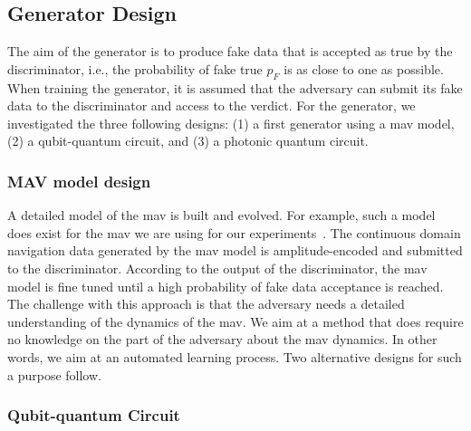 \documentclass[letterpaper, 10pt, conference]{IEEEtran}
\begin{document}
\subsection{Generator Design}
\label{Generator}
The aim of the generator is to produce fake data that is accepted as
true by the discriminator, i.e., the probability of fake true $p_F$ is
as close to one as possible. When training the generator, it is
assumed that the adversary can submit its fake data to the
discriminator and access to the verdict. For the generator,
we investigated the three following designs: (1) a first generator using a
\gls*{mav} model, (2) a qubit-quantum circuit, and (3) 
a photonic quantum circuit. 

\subsubsection{MAV model design}

A detailed model of the \gls*{mav} is built and evolved. For example,
such a model does exist for the \gls*{mav} we are using for our
experiments~\cite{MathWorks2019}. The continuous domain navigation data
generated by the \gls*{mav} model is amplitude-encoded and submitted
to the discriminator. According to the output of the discriminator,
the \gls*{mav} model is fine tuned until a high probability of fake
data acceptance is reached. The challenge with this approach is that
the adversary needs a detailed understanding of the dynamics of the
\gls*{mav}. We aim at a method that does require no knowledge on the
part of the adversary about the \gls*{mav} dynamics. In other words, 
we aim at an automated learning process. Two alternative designs for 
such a purpose follow.

\subsubsection{Qubit-quantum Circuit}
\end{document}
